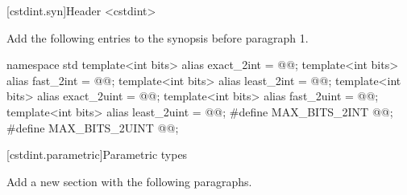 [cstdint.syn]{Header <cstdint>}

Add the following entries to the synopsis before paragraph 1.

\begin{addedblock}
\begin{codeblock}
namespace std {
  template<int bits> alias exact_2int = @\impdefx{}@;
  template<int bits> alias fast_2int = @\impdefx{}@;
  template<int bits> alias least_2int = @\impdefx{}@;
  template<int bits> alias exact_2uint = @\impdefx{}@;
  template<int bits> alias fast_2uint = @\impdefx{}@;
  template<int bits> alias least_2uint = @\impdefx{}@;
}
#define MAX_BITS_2INT @\impdefx{}@;
#define MAX_BITS_2UINT @\impdefx{}@;
\end{codeblock}
\end{addedblock}

[cstdint.parametric]{Parametric types}

Add a new section with the following paragraphs.

